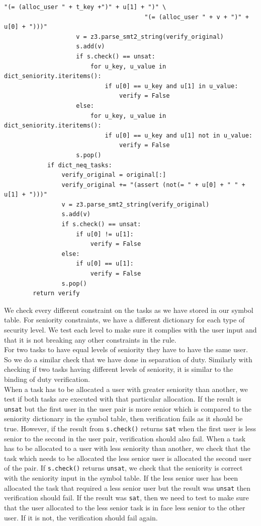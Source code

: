 \documentclass[a4paper]{report}
\begin{document}
\begin{lstlisting}[frame=single]
                                       "(= (alloc_user " + t_key +")" + u[1] + ")" \
                                       "(= (alloc_user " + v + ")" + u[0] + ")))"
                    v = z3.parse_smt2_string(verify_original)
                    s.add(v)
                    if s.check() == unsat:
                        for u_key, u_value in dict_seniority.iteritems():
                            if u[0] == u_key and u[1] in u_value:
                                verify = False
                    else:
                        for u_key, u_value in dict_seniority.iteritems():
                            if u[0] == u_key and u[1] not in u_value:
                                verify = False
                    s.pop()
            if dict_neq_tasks:
                verify_original = original[:]
                verify_original += "(assert (not(= " + u[0] + " " + u[1] + ")))"
                v = z3.parse_smt2_string(verify_original)
                s.add(v)
                if s.check() == unsat:
                    if u[0] != u[1]:
                        verify = False
                else:
                    if u[0] == u[1]:
                        verify = False
                s.pop()
        return verify
\end{lstlisting}

We check every different constraint on the tasks as we have stored in our symbol table. For seniority constraints, we have a different dictionary for each type of security level. We test each level to make sure it complies with the user input and that it is not breaking any other constraints in the rule.\\

For two tasks to have equal levels of seniority they have to have the same user. So we do a similar check that we have done in separation of duty. Similarly with checking if two tasks having different levels of seniority, it is similar to the binding of duty verification. \\

When a task has to be allocated a user with greater seniority than another, we test if both tasks are executed with that particular allocation. If the result is \texttt{unsat} but the first user in the user pair is more senior which is compared to the seniority dictionary in the symbol table, then verification fails as it should be true. However, if the result from \texttt{s.check()} returns \texttt{sat} when the first user is less senior to the second in the user pair, verification should also fail. When a task has to be allocated to a user with less seniority than another, we check that the task which needs to be allocated the less senior user is allocated the second user of the pair. If \texttt{s.check()} returns \texttt{unsat}, we check that the seniority is correct with the seniority input in the symbol table. If the less senior user has been allocated the task that required a less senior user but the result was \texttt{unsat} then verification should fail. If the result was \texttt{sat}, then we need to test to make sure that the user allocated to the less senior task is in face less senior to the other user. If it is not, the verification should fail again.
\end{document}
